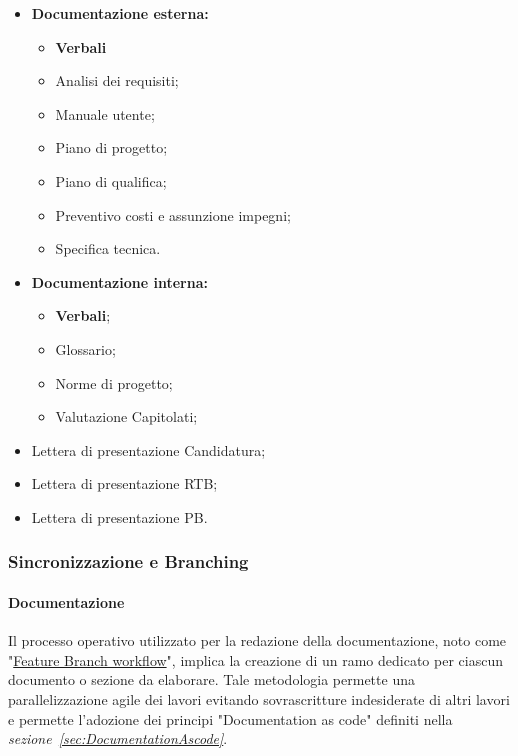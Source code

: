 \begin{itemize}
    \item \textbf{Documentazione esterna:}
        \begin{itemize}
            \item \textbf{Verbali}
            \item Analisi dei requisiti;
            \item Manuale utente;
            \item Piano di progetto;
            \item Piano di qualifica;
            \item Preventivo costi e assunzione impegni;
            \item Specifica tecnica.
        \end{itemize}
    \item \textbf{Documentazione interna:}
        \begin{itemize}
            \item \textbf{Verbali};
            \item Glossario;
            \item Norme di progetto;
            \item Valutazione Capitolati;
        \end{itemize}
    \item Lettera di presentazione Candidatura;
    \item Lettera di presentazione RTB;
    \item Lettera di presentazione PB.
\end{itemize}

\hypertarget{subsubsec:sincronizzazione&branching}{\subsubsection{Sincronizzazione e Branching}}
\paragraph{Documentazione}
Il processo operativo utilizzato per la redazione della documentazione, noto come "\href{https://www.atlassian.com/git/tutorials/comparing-workflows/feature-branch-workflow}{Feature Branch workflow}", implica la creazione di un ramo dedicato per ciascun documento o sezione da elaborare.
Tale metodologia permette una parallelizzazione agile dei lavori evitando sovrascritture indesiderate di altri lavori e permette l'adozione dei principi "Documentation as code" definiti nella \textit{sezione~\ref{sec:DocumentationAscode}}. \\ 

